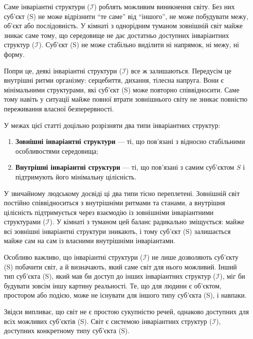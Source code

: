 \documentclass[aps,prd,onecolumn,nofootinbib,superscriptaddress]{revtex4-2} %
\begin{document}
    Саме інваріантні структури ($\mathcal{I}$) роблять можливим виникнення світу. Без них суб’єкт (S) не може відрізнити “те саме” від “іншого”, не може побудувати межу, об’єкт або послідовність. У кімнаті з однорідним туманом зовнішній світ майже зникає саме тому, що середовище не дає достатньо доступних інваріантних структур ($\mathcal{I}$). Суб’єкт (S) не може стабільно виділити ні напрямок, ні межу, ні форму.

    Попри це, деякі інваріантні структури ($\mathcal{I}$) все ж залишаються. Передусім це внутрішні ритми організму: серцебиття, дихання, тілесна напруга. Вони є мінімальними структурами, які суб’єкт (S) може повторно співвідносити. Саме тому навіть у ситуації майже повної втрати зовнішнього світу не зникає повністю переживання власної безперервності.

    У межах цієї статті доцільно розрізняти два типи інваріантних структур:

    \begin{enumerate}
        \item \textbf{Зовнішні інваріантні структури} --- ті, що пов’язані з відносно стабільними особливостями середовища;

        \item \textbf{Внутрішні інваріантні структури} --- ті, що пов’язані з самим суб’єктом \(S\) і підтримують його мінімальну цілісність.
    \end{enumerate}

    У звичайному людському досвіді ці два типи тісно переплетені. Зовнішній світ постійно співвідноситься з внутрішніми ритмами та станами, а внутрішня цілісність підтримується через взаємодію із зовнішніми інваріантними структурами ($\mathcal{I}$). У кімнаті з туманом цей баланс радикально зміщується: майже всі зовнішні інваріантні структури зникають, і тому суб’єкт (S) залишається майже сам на сам із власними внутрішніми інваріантами.

    Особливо важливо, що інваріантні структури ($\mathcal{I}$) не лише дозволяють суб’єкту (S) побачити світ, а й визначають, який саме світ для нього можливий. Інший тип суб’єкта (S), який мав би доступ до інших інваріантних структур ($\mathcal{I}$), міг би будувати зовсім іншу картину реальності. Те, що для людини є об’єктом, простором або подією, може не існувати для іншого типу суб’єкта (S), і навпаки.

    Звідси випливає, що світ не є простою сукупністю речей, однаково доступних для всіх можливих суб’єктів (S). Світ є системою інваріантних структур ($\mathcal{I}$), доступних конкретному типу суб’єкта (S).
\end{document}
